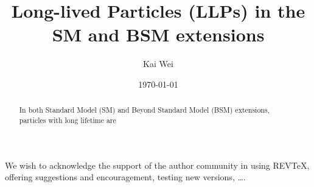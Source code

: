 \documentclass[%
twocolumn,
 amsmath,amssymb,
prb,
floatfix,
]{revtex4-2}
\begin{document}

\title{Long-lived Particles (LLPs) in the SM and BSM extensions}%

\author{Kai Wei}
%


\date{\today}%

\begin{abstract}
In both Standard Model (SM) and Beyond Standard Model (BSM) extensions, particles with long lifetime are 
\end{abstract}

\maketitle

















\begin{acknowledgments}
We wish to acknowledge the support of the author community in using
REV\TeX{}, offering suggestions and encouragement, testing new versions,
\dots.
\end{acknowledgments}

\appendix


\nocite{*}

\end{document}
